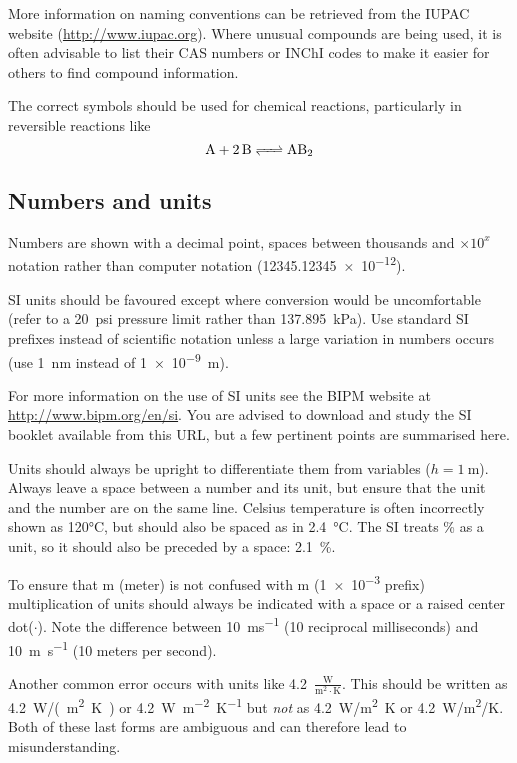 \documentclass[a5paper, 10pt]{article}
\begin{document}
More information on naming conventions can be retrieved from the IUPAC
website (\url{http://www.iupac.org}).  Where unusual compounds are being used, it is often advisable to list their CAS numbers or INChI codes to make it easier for others to find compound information.

The correct symbols should be used for chemical reactions,
particularly in reversible reactions like
\begin{displaymath}
  \ce{A + 2B <=> AB2}
\end{displaymath}

\subsection{Numbers and units}
Numbers are shown with a decimal point, spaces between thousands and $\times 10^x$ notation rather than computer notation (\num{12345.12345e-12}).

SI units should be favoured except where conversion would be
uncomfortable (refer to a \SI{20}{psi} pressure limit rather than
\SI{137.895}{\kilo\pascal}).
Use standard
SI prefixes instead of scientific notation unless a large variation in
numbers occurs (use \SI{1}{\nano\meter} instead of \SI{1e-9}{\meter}).

For more information on the use of SI units see the BIPM website at \url{http://www.bipm.org/en/si}.  You are advised to download and study the SI booklet available from this URL, but a few pertinent points are summarised here.

Units should always be upright to differentiate them from variables ($h = \SI{1}{\meter}$).  
Always leave a space between a number and its
unit, but ensure that the unit and the number are on the same line.  
Celsius temperature is
often incorrectly shown as 120\si{\celsius}, but should also be spaced
as in \SI{2.4}{\celsius}.  The SI treats \% as a unit, so it should also be preceded by a space: \SI{2.1}{\%}.

To ensure that m (meter) is not confused with m (\num{1e-3} prefix) multiplication of units should always be indicated with a space or a raised center dot($\cdot$).
Note the difference between \SI{10}{ms^{-1}} (10 reciprocal milliseconds) and \SI{10}{m.s^{-1}} (10 meters per second).

Another common error occurs with units like 
\num{4.2}~$\frac{\mathrm{W}}{\mathrm{m}^2\cdot\mathrm{K}}$.  
This should be written as \SI{4.2}{W/(m^2.K)} or
\SI{4.2}{W.m^{-2}.K^{-1}} 
but \emph{not} as \SI{4.2}{W/m^2K} or \SI{4.2}{W/m^2/K}.  
Both of these last forms are ambiguous and can therefore lead to misunderstanding.
\end{document}
